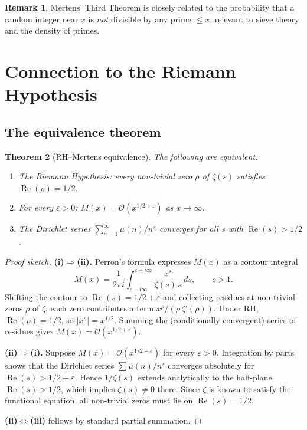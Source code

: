 \documentclass[12pt,a4paper]{amsart}
\newtheorem{theorem}{Theorem}[section]
\theoremstyle{definition}
\newtheorem{remark}[theorem]{Remark}
\newcommand{\BigO}{\mathcal{O}}
\begin{document}
\begin{remark}
Mertens' Third Theorem is closely related to the probability that a random
integer near $x$ is \emph{not} divisible by any prime $\le x$, relevant to
sieve theory and the density of primes.
\end{remark}

\section{Connection to the Riemann Hypothesis}
\label{sec:rh}

\subsection{The equivalence theorem}

\begin{theorem}[RH--Mertens equivalence]
\label{thm:rh-equiv}
The following are equivalent:
\begin{enumerate}[label=(\roman*)]
  \item The Riemann Hypothesis: every non-trivial zero $\rho$ of $\zeta(s)$
        satisfies $\operatorname{Re}(\rho) = 1/2$.
  \item For every $\varepsilon > 0$: $M(x) = \BigO(x^{1/2+\varepsilon})$
        as $x \to \infty$.
  \item The Dirichlet series $\sum_{n=1}^{\infty}\mu(n)/n^s$ converges for all
        $s$ with $\operatorname{Re}(s) > 1/2$.
\end{enumerate}
\end{theorem}

\begin{proof}[Proof sketch]
\textbf{(i)$\Rightarrow$(ii).}
Perron's formula expresses $M(x)$ as a contour integral
\[
  M(x) = \frac{1}{2\pi i}\int_{c-i\infty}^{c+i\infty}
          \frac{x^s}{\zeta(s)\,s}\,ds, \qquad c > 1.
\]
Shifting the contour to $\operatorname{Re}(s)=1/2+\varepsilon$ and collecting
residues at non-trivial zeros $\rho$ of $\zeta$, each zero contributes a term
$x^{\rho}/(\rho\,\zeta'(\rho))$.  Under RH, $\operatorname{Re}(\rho)=1/2$,
so $|x^{\rho}| = x^{1/2}$.  Summing the (conditionally convergent) series of
residues gives $M(x) = \BigO(x^{1/2+\varepsilon})$.

\textbf{(ii)$\Rightarrow$(i).}
Suppose $M(x) = \BigO(x^{1/2+\varepsilon})$ for every $\varepsilon > 0$.
Integration by parts shows that the Dirichlet series
$\sum\mu(n)/n^s$ converges absolutely for $\operatorname{Re}(s)>1/2+\varepsilon$.
Hence $1/\zeta(s)$ extends analytically to the half-plane
$\operatorname{Re}(s)>1/2$, which implies $\zeta(s) \ne 0$ there.  Since
$\zeta$ is known to satisfy the functional equation, all non-trivial zeros
must lie on $\operatorname{Re}(s)=1/2$.

\textbf{(ii)$\Leftrightarrow$(iii)} follows by standard partial summation.
\end{proof}
\end{document}

